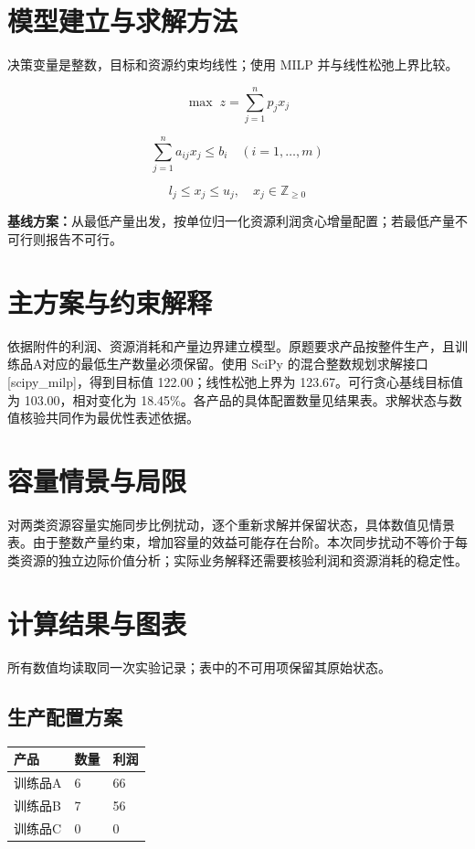 \documentclass[UTF8,a4paper,11pt,fontset=fandol]{ctexart}
\begin{document}
\section{模型建立与求解方法}
决策变量是整数，目标和资源约束均线性；使用 MILP 并与线性松弛上界比较。

\begin{equation}
\max\; z=\sum_{j=1}^{n}p_jx_j
\end{equation}

\begin{equation}
\sum_{j=1}^{n}a_{ij}x_j\leq b_i\quad(i=1,\ldots,m)
\end{equation}

\begin{equation}
l_j\leq x_j\leq u_j,\quad x_j\in\mathbb{Z}_{\geq0}
\end{equation}

\noindent\textbf{基线方案：}从最低产量出发，按单位归一化资源利润贪心增量配置；若最低产量不可行则报告不可行。


\section{主方案与约束解释}
依据附件的利润、资源消耗和产量边界建立模型。原题要求产品按整件生产，且训练品A对应的最低生产数量必须保留。使用 SciPy 的混合整数规划求解接口[scipy\_milp]，得到目标值 122.00；线性松弛上界为 123.67。可行贪心基线目标值为 103.00，相对变化为 18.45\%。各产品的具体配置数量见结果表。求解状态与数值核验共同作为最优性表述依据。

\section{容量情景与局限}
对两类资源容量实施同步比例扰动，逐个重新求解并保留状态，具体数值见情景表。由于整数产量约束，增加容量的效益可能存在台阶。本次同步扰动不等价于每类资源的独立边际价值分析；实际业务解释还需要核验利润和资源消耗的稳定性。


\section{计算结果与图表}
所有数值均读取同一次实验记录；表中的不可用项保留其原始状态。

\subsection*{生产配置方案}
{\small
\begin{longtable}{lll}
\toprule
产品 & 数量 & 利润 \\ 
\midrule\endhead

训练品A & 6 & 66 \\ 

训练品B & 7 & 56 \\ 

训练品C & 0 & 0 \\ 

\bottomrule
\end{longtable}}
\end{document}
